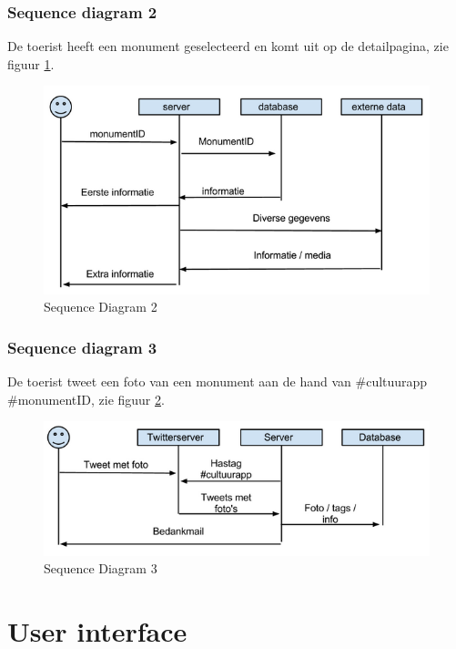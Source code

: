 \documentclass[a4paper,10pt]{article}
\begin{document}
			\subsubsection{Sequence diagram 2}
			De toerist heeft een monument geselecteerd en komt uit op de detailpagina, zie figuur \ref{sequence2}.
			\begin{figure}[ht!]
				\centering
				\includegraphics[width=\textwidth]{sequence2.png}
				\caption{Sequence Diagram 2 \label{sequence2}}
			\end{figure}
			\subsubsection{Sequence diagram 3}
			De toerist tweet een foto van een monument aan de hand van \#cultuurapp \#monumentID, zie figuur \ref{sequence3}.
			\begin{figure}[ht!]
				\centering
				\includegraphics[width=\textwidth]{sequence3.png}
				\caption{Sequence Diagram 3 \label{sequence3}}
			\end{figure}
		
		\clearpage			
		\section{User interface}
\end{document}
